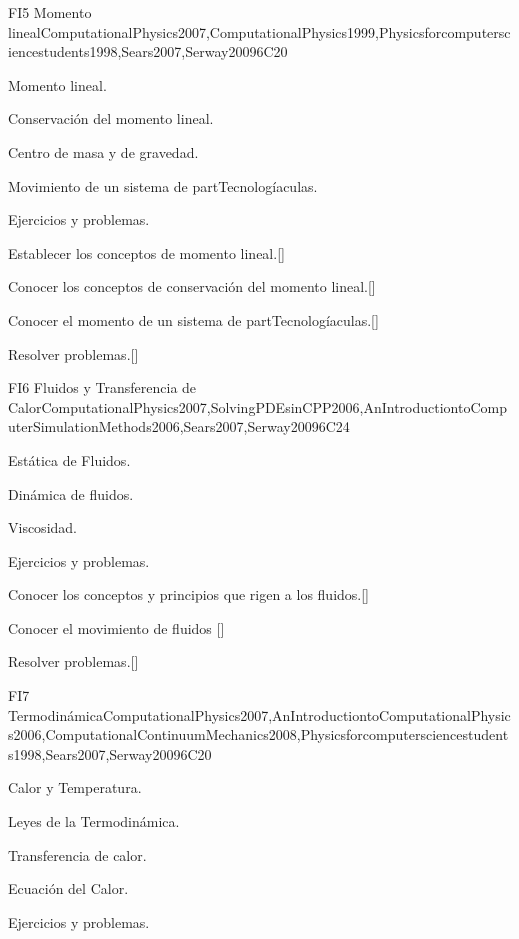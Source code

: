 \begin{syllabus}
\begin{unit}{}{FI5 Momento lineal}{ComputationalPhysics2007,ComputationalPhysics1999,Physicsforcomputersciencestudents1998,Sears2007,Serway2009}{6}{C20}
\begin{topics}
      \item Momento lineal.
      \item Conservación del momento lineal.
      \item Centro de masa y de gravedad.
      \item Movimiento de un sistema de partTecnologíaculas.
      \item Ejercicios y problemas.
  \end{topics}

   \begin{learningoutcomes}
      \item Establecer los conceptos de momento lineal.[\Usage]
      \item Conocer los conceptos de conservación del momento lineal.[\Usage]
      \item Conocer el momento de un sistema de partTecnologíaculas.[\Usage]
      \item Resolver problemas.[\Usage]
   \end{learningoutcomes}
\end{unit}

\begin{unit}{}{FI6 Fluidos y Transferencia de Calor}{ComputationalPhysics2007,SolvingPDEsinCPP2006,AnIntroductiontoComputerSimulationMethods2006,Sears2007,Serway2009}{6}{C24}
\begin{topics}
      \item Estática de Fluidos.
      \item Dinámica de fluidos. 
      \item Viscosidad.
      \item Ejercicios y problemas.
  \end{topics}

   \begin{learningoutcomes}
      \item Conocer los conceptos y principios que rigen a los fluidos.[\Usage]
      \item Conocer el movimiento de fluidos [\Usage]
      \item Resolver problemas.[\Usage]
   \end{learningoutcomes}
\end{unit}

\begin{unit}{}{FI7 Termodinámica}{ComputationalPhysics2007,AnIntroductiontoComputationalPhysics2006,ComputationalContinuumMechanics2008,Physicsforcomputersciencestudents1998,Sears2007,Serway2009}{6}{C20}
\begin{topics}
      \item Calor y Temperatura.
      \item Leyes de la Termodinámica.
      \item Transferencia de calor.
      \item Ecuación del Calor.
      \item Ejercicios y problemas.
  \end{topics}


\end{unit}
\end{syllabus}
